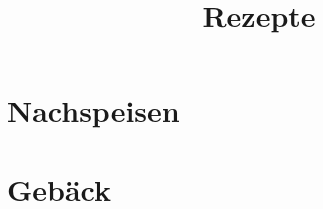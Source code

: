 \documentclass[12pt,a4paper]{book}
\begin{document}
\title{\bfseries\Huge Rezepte}
\maketitle
\tableofcontents

\chapter{Nachspeisen}


\chapter{Gebäck}






\appendix

\printindex[recipe]

\printindex[ingredient]
\end{document}
